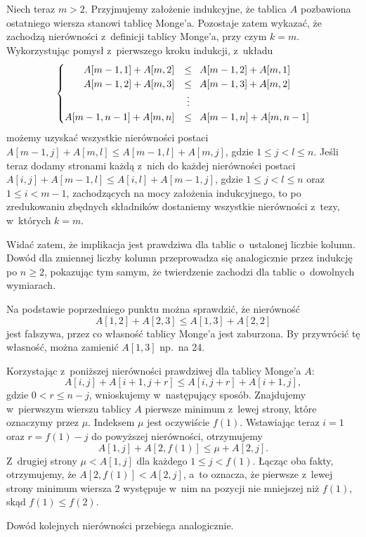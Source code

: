 Niech teraz $m>2$.
Przyjmujemy założenie indukcyjne, że tablica $A$ pozbawiona ostatniego wiersza stanowi tablicę Monge'a.
Pozostaje zatem wykazać, że zachodzą nierówności z~definicji tablicy Monge'a, przy czym $k=m$.
Wykorzystując pomysł z~pierwszego kroku indukcji, z~układu
\[
	\begin{cases}
		\hfill A[m-1,1]+A[m,2] &\le\,\,\, A[m-1,2]+A[m,1] \\
		\hfill A[m-1,2]+A[m,3] &\le\,\,\, A[m-1,3]+A[m,2] \\
		& \;\vdots \\
		A[m-1,n-1]+A[m,n] &\le\,\,\, A[m-1,n]+A[m,n-1] \\
	\end{cases}
\]
możemy uzyskać wszystkie nierówności postaci $A[m-1,j]+A[m,l]\le A[m-1,l]+A[m,j]$, gdzie $1\le j<l\le n$.
Jeśli teraz dodamy stronami każdą z~nich do każdej nierówności postaci $A[i,j]+A[m-1,l]\le A[i,l]+A[m-1,j]$, gdzie $1\le j<l\le n$ oraz $1\le i<m-1$, zachodzących na mocy założenia indukcyjnego, to po zredukowaniu zbędnych składników dostaniemy wszystkie nierówności z~tezy, w~których $k=m$.

Widać zatem, że implikacja jest prawdziwa dla tablic o~ustalonej liczbie kolumn.
Dowód dla zmiennej liczby kolumn przeprowadza się analogicznie przez indukcję po $n\ge2$, pokazując tym samym, że twierdzenie zachodzi dla tablic o~dowolnych wymiarach.

\subproblem %
Na podstawie poprzedniego punktu można sprawdzić, że nierówność
\[
	A[1,2]+A[2,3] \le A[1,3]+A[2,2]
\]
jest fałszywa, przez co własność tablicy Monge'a jest zaburzona.
By przywrócić tę własność, można zamienić $A[1,3]$ np.\ na 24.

\subproblem %
Korzystając z~poniższej nierówności prawdziwej dla tablicy Monge'a $A$:
\[
	A[i,j]+A[i+1,j+r] \le A[i,j+r]+A[i+1,j],
\]
gdzie $0<r\le n-j$, wnioskujemy w~następujący sposób.
Znajdujemy w~pierwszym wierszu tablicy $A$ pierwsze minimum z~lewej strony, które oznaczymy przez $\mu$.
Indeksem $\mu$ jest oczywiście $f(1)$.
Wstawiając teraz $i=1$ oraz $r=f(1)-j$ do powyższej nierówności, otrzymujemy
\[
	A[1,j]+A[2,f(1)] \le \mu+A[2,j].
\]
Z~drugiej strony $\mu<A[1,j]$ dla każdego $1\le j<f(1)$.
Łącząc oba fakty, otrzymujemy, że $A[2,f(1)]<A[2,j]$, a~to oznacza, że pierwsze z~lewej strony minimum wiersza 2 występuje w~nim na pozycji nie mniejszej niż $f(1)$, skąd $f(1)\le f(2)$.

Dowód kolejnych nierówności przebiega analogicznie.

